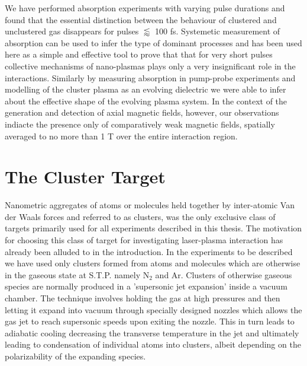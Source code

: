 \documentclass[a4paper,12pt]{article}
\begin{document}
We have performed absorption experiments with varying pulse durations and found that the essential distinction between the behaviour of clustered and unclustered gas disappears for pulses $\lessapprox$ 100 fs. Systemetic measurement of absorption can be used to infer the type of dominant processes and has been used here as a simple and effective tool to prove that that for very short pulses collective mechanisms of nano-plasmas plays only a very insignificant role in the interactions. Similarly by measuring absorption in pump-probe experiments and modelling of the cluster plasma as an evolving dielectric we were able to infer about the effective shape of the evolving plasma system. In the context of the generation and detection of axial magnetic fields, however, our observations indiacte the presence only of comparatively weak magnetic fields, spatially averaged to no more than 1 T over the entire interaction region.

\section{The Cluster Target}
Nanometric aggregates of atoms or molecules held together by inter-atomic Van der Waals forces and referred to as clusters, was the only exclusive class of targets primarily used for all experiments described in this thesis. The motivation for choosing this class of target for investigating laser-plasma interaction has already been alluded to in the introduction.
In the experiments to be described we have used only clusters formed from atoms and molecules which are otherwise in the gaseous state at S.T.P. namely N$_2$ and Ar.
Clusters of otherwise gaseous species are normally produced in a 'supersonic jet expansion' inside a vacuum chamber. The technique involves holding the gas at high pressures and then letting it expand into vacuum through specially designed nozzles which allows the gas jet to reach supersonic speeds upon exiting the nozzle. This in turn leads to adiabatic cooling decreasing the transverse temperature in the jet and ultimately leading to condensation of individual atoms into clusters, albeit depending on the polarizability of the expanding species.
\end{document}
